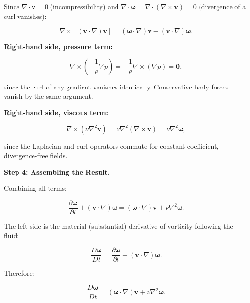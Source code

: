Since $\nabla\cdot\mathbf{v} = 0$ (incompressibility) and $\nabla\cdot\boldsymbol{\omega} = \nabla\cdot(\nabla\times\mathbf{v}) = 0$ (divergence of a curl vanishes):

\begin{equation}
\nabla\times\left[(\mathbf{v}\cdot\nabla)\mathbf{v}\right] = (\boldsymbol{\omega}\cdot\nabla)\mathbf{v} - (\mathbf{v}\cdot\nabla)\boldsymbol{\omega}.
\end{equation}

\textbf{Right-hand side, pressure term:}

\begin{equation}
\nabla\times\left(-\frac{1}{\rho}\nabla p\right) = -\frac{1}{\rho}\nabla\times(\nabla p) = \mathbf{0},
\end{equation}

since the curl of any gradient vanishes identically. Conservative body forces vanish by the same argument.

\textbf{Right-hand side, viscous term:}

\begin{equation}
\nabla\times\left(\nu\nabla^2\mathbf{v}\right) = \nu\nabla^2(\nabla\times\mathbf{v}) = \nu\nabla^2\boldsymbol{\omega},
\end{equation}

since the Laplacian and curl operators commute for constant-coefficient, divergence-free fields.

\textbf{Step 4: Assembling the Result.}

Combining all terms:

\begin{equation}
\frac{\partial \boldsymbol{\omega}}{\partial t} + (\mathbf{v}\cdot\nabla)\boldsymbol{\omega} = (\boldsymbol{\omega}\cdot\nabla)\mathbf{v} + \nu\nabla^2\boldsymbol{\omega}.
\end{equation}

The left side is the material (substantial) derivative of vorticity following the fluid:

\begin{equation}
\frac{D\boldsymbol{\omega}}{Dt} = \frac{\partial \boldsymbol{\omega}}{\partial t} + (\mathbf{v}\cdot\nabla)\boldsymbol{\omega}.
\end{equation}

Therefore:

\begin{equation}
\boxed{\frac{D\boldsymbol{\omega}}{Dt} = (\boldsymbol{\omega}\cdot\nabla)\mathbf{v} + \nu\nabla^2\boldsymbol{\omega}.}
\end{equation}

